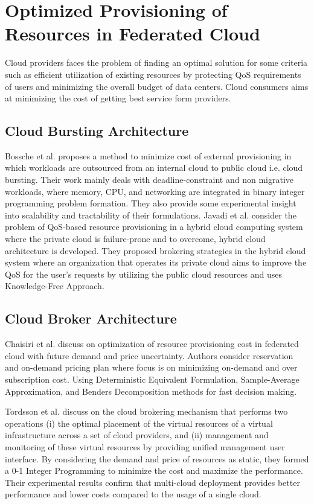 \documentclass[conference]{IEEEtran}
\begin{document}
\section{Optimized Provisioning of Resources in Federated Cloud}

Cloud providers faces the problem of finding an optimal solution for some criteria such as efficient utilization of existing resources by protecting QoS requirements of users and minimizing the overall budget of data centers. Cloud consumers aims at minimizing the cost of getting best service form providers.

\subsection{Cloud Bursting Architecture}

Bossche et al. \cite{van2010cost} proposes a method to minimize cost of external provisioning in which workloads are outsourced from an internal cloud to public cloud i.e. cloud bursting. Their work mainly deals with deadline-constraint and non migrative workloads, where memory, CPU, and networking are integrated in binary integer programming problem formation. They also provide some experimental insight into scalability and tractability of their formulations. 
Javadi et al. \cite{javadi2012failure} consider the problem of QoS-based resource provisioning in a hybrid cloud computing system where the private cloud is failure-prone and to overcome, hybrid cloud architecture is developed. They proposed brokering strategies in the hybrid cloud system where an organization that operates its private cloud aims to improve the QoS for the user's requests by utilizing the public cloud resources and uses Knowledge-Free Approach. 

\subsection{Cloud Broker Architecture}

Chaisiri et al. \cite{chaisiri2012optimization} discuss on optimization of resource provisioning cost in federated cloud with future demand and price uncertainty. Authors consider reservation and on-demand pricing plan where focus is on minimizing on-demand and over subscription cost. Using Deterministic Equivalent Formulation, Sample-Average Approximation, and Benders Decomposition methods for fast decision making.

Tordsson et al. \cite{tordsson2012cloud} discuss on the cloud brokering mechanism that performs two operations (i) the optimal placement of the virtual resources of a virtual infrastructure across a set of cloud providers, and (ii) management and monitoring of these virtual resources by providing unified management user interface. By considering the demand and price of resources as static, they formed a 0-1 Integer Programming to minimize the cost and maximize the performance. Their experimental results confirm that multi-cloud deployment provides better performance and lower costs compared to the usage of a single cloud. 
\end{document}
